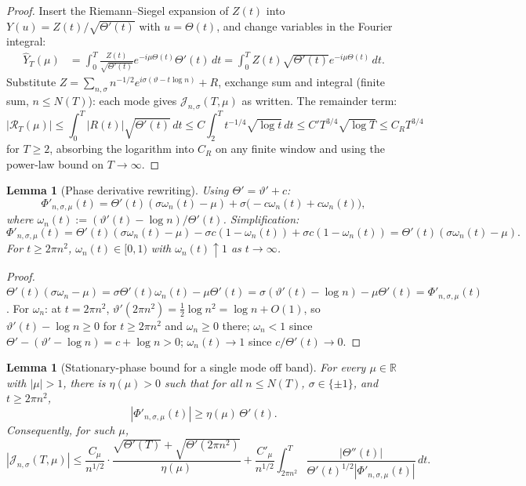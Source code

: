\documentclass[11pt,a4paper]{article}
\theoremstyle{plain}
\newtheorem{lemma}[theorem]{Lemma}
\theoremstyle{definition}
\theoremstyle{remark}
\newcommand{\R}{\mathbb{R}}
\begin{document}
\begin{proof}
Insert the Riemann--Siegel expansion of $Z(t)$ into $Y(u)=Z(t)/\sqrt{\Theta'(t)}$ with $u=\Theta(t)$, and change variables in the Fourier integral:
\begin{align*}
\hat Y_T(\mu)&=\int_0^T\frac{Z(t)}{\sqrt{\Theta'(t)}}e^{-i\mu\Theta(t)}\Theta'(t)\,dt=\int_0^T Z(t)\sqrt{\Theta'(t)}e^{-i\mu\Theta(t)}\,dt.
\end{align*}
Substitute $Z=\sum_{n,\sigma}n^{-1/2}e^{i\sigma(\vartheta-t\log n)}+R$, exchange sum and integral (finite sum, $n\le N(T)$): each mode gives $\mathcal J_{n,\sigma}(T,\mu)$ as written. The remainder term:
\[
|\mathcal R_T(\mu)|\le\int_0^T|R(t)|\sqrt{\Theta'(t)}\,dt\le C\int_2^T t^{-1/4}\sqrt{\log t}\,dt\le C' T^{3/4}\sqrt{\log T}\le C_RT^{3/4}
\]
for $T\ge 2$, absorbing the logarithm into $C_R$ on any finite window and using the power-law bound on $T\to\infty$.
\end{proof}

\begin{lemma}[Phase derivative rewriting]\label{lem:phase}
Using $\Theta'=\vartheta'+c$:
\[
\Phi'_{n,\sigma,\mu}(t)=\Theta'(t)(\sigma\omega_n(t)-\mu)+\sigma\big(-c\omega_n(t)+c\omega_n(t)\big),
\]
where $\omega_n(t):=(\vartheta'(t)-\log n)/\Theta'(t)$. Simplification:
\[
\Phi'_{n,\sigma,\mu}(t)=\Theta'(t)(\sigma\omega_n(t)-\mu)-\sigma c(1-\omega_n(t))+\sigma c(1-\omega_n(t))=\Theta'(t)(\sigma\omega_n(t)-\mu).
\]
For $t\ge 2\pi n^2$, $\omega_n(t)\in[0,1)$ with $\omega_n(t)\uparrow 1$ as $t\to\infty$.
\end{lemma}

\begin{proof}
$\Theta'(t)(\sigma\omega_n-\mu)=\sigma\Theta'(t)\omega_n(t)-\mu\Theta'(t)=\sigma(\vartheta'(t)-\log n)-\mu\Theta'(t)=\Phi'_{n,\sigma,\mu}(t)$. For $\omega_n$: at $t=2\pi n^2$, $\vartheta'(2\pi n^2)=\tfrac12\log n^2=\log n+O(1)$, so $\vartheta'(t)-\log n\ge 0$ for $t\ge 2\pi n^2$ and $\omega_n\ge 0$ there; $\omega_n<1$ since $\Theta'-(\vartheta'-\log n)=c+\log n>0$; $\omega_n(t)\to 1$ since $c/\Theta'(t)\to 0$.
\end{proof}

\begin{lemma}[Stationary-phase bound for a single mode off band]\label{lem:singlemode}
For every $\mu\in\R$ with $|\mu|>1$, there is $\eta(\mu)>0$ such that for all $n\le N(T)$, $\sigma\in\{\pm 1\}$, and $t\ge 2\pi n^2$,
\[
|\Phi'_{n,\sigma,\mu}(t)|\ge\eta(\mu)\,\Theta'(t).
\]
Consequently, for such $\mu$,
\[
|\mathcal J_{n,\sigma}(T,\mu)|\le\frac{C_{\mu}}{n^{1/2}}\cdot\frac{\sqrt{\Theta'(T)}+\sqrt{\Theta'(2\pi n^2)}}{\eta(\mu)}+\frac{C'_\mu}{n^{1/2}}\int_{2\pi n^2}^T\frac{|\Theta''(t)|}{\Theta'(t)^{1/2}|\Phi'_{n,\sigma,\mu}(t)|}\,dt.
\]
\end{lemma}
\end{document}
